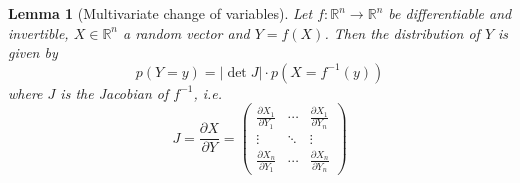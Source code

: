 \documentclass[11pt,a4paper]{book}
\newtheorem{lemma}{Lemma}
\begin{document}
\begin{lemma}[Multivariate change of variables]
  \label{lemma:multivariate-change}
  Let $f : \mathbb{R}^{n} \rightarrow \mathbb{R}^{n}$ be differentiable and
  invertible, $X \in \mathbb{R}^{n}$ a random vector and $Y = f(X)$. Then the
  distribution of $Y$ is given by
  \begin{equation*}
    p(Y = y) = \left| \det J \right| \cdot p(X = f^{-1}(y))
  \end{equation*}
  where $J$ is the Jacobian of $f^{-1}$, i.e.
  \begin{equation*}
    J = \frac{\partial X}{\partial Y} = \begin{pmatrix}
      \frac{\partial X_{1}}{\partial Y_{1}} & \cdots & \frac{\partial X_{1}}{\partial Y_{n}}\\
      \vdots & \ddots & \vdots\\
      \frac{\partial X_{n}}{\partial Y_{1}} & \cdots & \frac{\partial X_{n}}{\partial Y_{n}}
    \end{pmatrix}
  \end{equation*}
\end{lemma}
\end{document}
